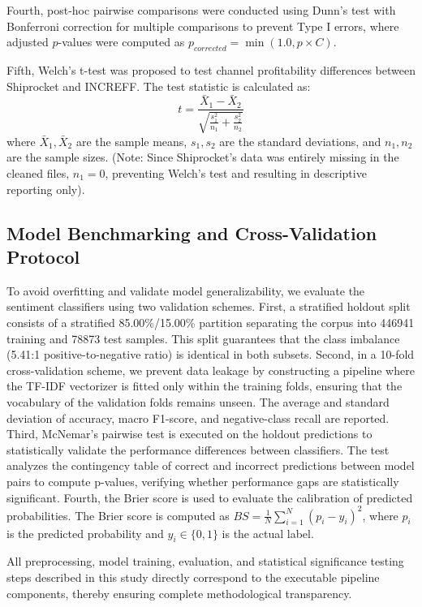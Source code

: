 \documentclass[authoryear,review,3p,times,12pt]{elsarticle}
\begin{document}
Fourth, post-hoc pairwise comparisons were conducted using Dunn's test with Bonferroni correction for multiple comparisons to prevent Type I errors, where adjusted $p$-values were computed as $p_{corrected} = \min(1.0, p \times C)$.

Fifth, Welch's t-test was proposed to test channel profitability differences between Shiprocket and INCREFF. The test statistic is calculated as:
\begin{equation}
    t = \frac{\bar{X}_1 - \bar{X}_2}{\sqrt{\frac{s_1^2}{n_1} + \frac{s_2^2}{n_2}}}
\end{equation}
where $\bar{X}_1, \bar{X}_2$ are the sample means, $s_1, s_2$ are the standard deviations, and $n_1, n_2$ are the sample sizes. (Note: Since Shiprocket's data was entirely missing in the cleaned files, $n_1 = 0$, preventing Welch's test and resulting in descriptive reporting only).

\subsection{Model Benchmarking and Cross-Validation Protocol}
To avoid overfitting and validate model generalizability, we evaluate the sentiment classifiers using two validation schemes. First, a stratified holdout split consists of a stratified 85.00\%/15.00\% partition separating the corpus into 446941 training and 78873 test samples. This split guarantees that the class imbalance (5.41:1 positive-to-negative ratio) is identical in both subsets. Second, in a 10-fold cross-validation scheme, we prevent data leakage by constructing a pipeline where the TF-IDF vectorizer is fitted only within the training folds, ensuring that the vocabulary of the validation folds remains unseen. The average and standard deviation of accuracy, macro F1-score, and negative-class recall are reported. Third, McNemar's pairwise test is executed on the holdout predictions to statistically validate the performance differences between classifiers. The test analyzes the contingency table of correct and incorrect predictions between model pairs to compute p-values, verifying whether performance gaps are statistically significant. Fourth, the Brier score is used to evaluate the calibration of predicted probabilities. The Brier score is computed as $BS = \frac{1}{N} \sum_{i=1}^N (p_i - y_i)^2$, where $p_i$ is the predicted probability and $y_i \in \{0, 1\}$ is the actual label.

All preprocessing, model training, evaluation, and statistical significance testing steps described in this study directly correspond to the executable pipeline components, thereby ensuring complete methodological transparency.
\end{document}

